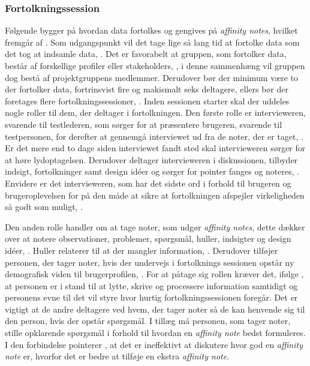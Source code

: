 \subsubsection{Fortolkningssession}
\label{ParametreFortolkningssession}
%
Følgende bygger på hvordan data fortolkes og gengives på \textit{affinity notes}, hvilket fremgår af \textcite[ss. 101-122]{Book:CIInterpretationSession}. Som udgangspunkt vil det tage lige så lang tid at fortolke data som det tog at indsamle data, \parencite[s. 102]{Book:CIInterpretationSession}. Det er favorabelt at gruppen, som fortolker data, består af forskellige profiler eller stakeholders, \parencite[s. 104]{Book:CIInterpretationSession}, i denne sammenhæng vil gruppen dog bestå af projektgruppens medlemmer. Derudover bør der minimum være to der fortolker data, fortrinsvist fire og makismalt seks deltagere, ellers bør der foretages flere fortolkningssessioner, \parencite[s. 104]{Book:CIInterpretationSession}. \blankline
%
Inden sessionen starter skal der uddeles nogle roller til dem, der deltager i fortolkningen. Den første rolle er intervieweren, svarende til testlederen, som sørger for at præsentere brugeren, svarende til testpersonen, for derefter at gennemgå interviewet ud fra de noter, der er taget, \parencite[ss. 106-107]{Book:CIInterpretationSession}. Er det mere end to dage siden interviewet fandt sted skal intervieweren sørger for at høre lydoptagelsen. Derudover deltager intervieweren i diskussionen, tilbyder indsigt, fortolkninger samt design idéer og sørger for pointer fanges og noteres, \parencite[s. 107]{Book:CIInterpretationSession}. Envidere er det intervieweren, som har det sidste ord i forhold til brugeren og brugeroplevelsen for på den måde at sikre at fortolkningen afspejler virkeligheden så godt som muligt, \parencite[s. 107]{Book:CIInterpretationSession}.

Den anden rolle handler om at tage noter, som udgør \textit{affinity notes}, dette dækker over at notere observationer, problemer, spørgsmål, huller, indsigter og design idéer, \parencite[s. 107]{Book:CIInterpretationSession}. Huller relaterer til at der mangler information, \parencite[s. 162]{Book:BuildingAnAffinity}. Derudover tilføjer personen, der tager noter, hvis der undervejs i fortolknings sessionen opstår ny demografisk viden til brugerprofilen, \parencite[s. 107]{Book:CIInterpretationSession}. For at påtage sig rollen kræver det, ifølge \textcite[s. 107]{Book:CIInterpretationSession}, at personen er i stand til at lytte, skrive og processere information samtidigt og personens evne til det vil styre hvor hurtig fortolkningssessionen foregår. Det er vigtigt at de andre deltagere ved hvem, der tager noter så de kan henvende sig til den person, hvis der opstår spørgsmål. I tillæg må personen, som tager noter, stille opklarende spørgsmål i forhold til hvordan en \textit{affinity note} bedst formuleres. I den forbindelse pointerer \textcite[s. 108]{Book:CIInterpretationSession}, at det er ineffektivt at diskutere hvor god en \textit{affinity note} er, hvorfor det er bedre at tilføje en ekstra \textit{affinity note}. 

